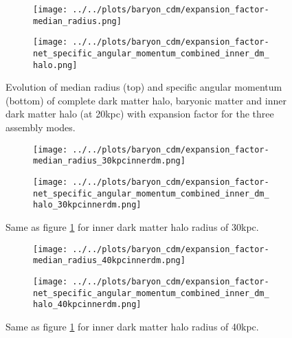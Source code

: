 \documentclass{article}
\begin{document}
	\begin{figure}
		
		\centering
		\begin{subfigure} {\columnwidth}
				\centering 
				\texttt{[image: ../../plots/baryon\_cdm/expansion\_factor-median\_radius.png]}
		\end{subfigure}		
		\begin{subfigure} {\columnwidth}
				\centering 
				\texttt{[image: ../../plots/baryon\_cdm/expansion\_factor-net\_specific\_angular\_momentum\_combined\_inner\_dm\_halo.png]}
		\end{subfigure}
		\caption{Evolution of median radius (top) and specific angular momentum (bottom) of complete dark matter halo, baryonic matter and inner dark matter halo (at 20kpc) with expansion factor for the three assembly modes.}
		\label{fig:1}

	\end{figure}

	\clearpage

	\begin{figure}
		
		\centering
		\begin{subfigure} {\columnwidth}
				\centering 
				\texttt{[image: ../../plots/baryon\_cdm/expansion\_factor-median\_radius\_30kpcinnerdm.png]}
		\end{subfigure}		
		\begin{subfigure} {\columnwidth}
				\centering 
				\texttt{[image: ../../plots/baryon\_cdm/expansion\_factor-net\_specific\_angular\_momentum\_combined\_inner\_dm\_halo\_30kpcinnerdm.png]}
		\end{subfigure}
		\caption{Same as figure \ref{fig:1} for inner dark matter halo radius of 30kpc.}
		
	\end{figure}

	\clearpage 

	\begin{figure}
		
		\centering
		\begin{subfigure} {\columnwidth}
				\centering 
				\texttt{[image: ../../plots/baryon\_cdm/expansion\_factor-median\_radius\_40kpcinnerdm.png]}
		\end{subfigure}		
		\begin{subfigure} {\columnwidth}
				\centering 
				\texttt{[image: ../../plots/baryon\_cdm/expansion\_factor-net\_specific\_angular\_momentum\_combined\_inner\_dm\_halo\_40kpcinnerdm.png]}
		\end{subfigure}
		\caption{Same as figure \ref{fig:1} for inner dark matter halo radius of 40kpc.}
		
	\end{figure}
\end{document}
